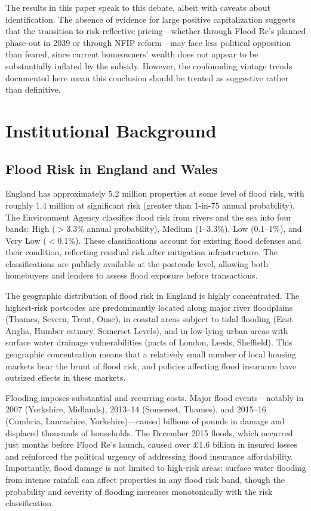 \documentclass[12pt]{article}
\begin{document}
The results in this paper speak to this debate, albeit with caveats about identification. The absence of evidence for large positive capitalization suggests that the transition to risk-reflective pricing---whether through Flood Re's planned phase-out in 2039 or through NFIP reform---may face less political opposition than feared, since current homeowners' wealth does not appear to be substantially inflated by the subsidy. However, the confounding vintage trends documented here mean this conclusion should be treated as suggestive rather than definitive.


\section{Institutional Background}
\label{sec:background}

\subsection{Flood Risk in England and Wales}

England has approximately 5.2 million properties at some level of flood risk, with roughly 1.4 million at significant risk (greater than 1-in-75 annual probability). The Environment Agency classifies flood risk from rivers and the sea into four bands: High ($>$3.3\% annual probability), Medium (1--3.3\%), Low (0.1--1\%), and Very Low ($<$0.1\%). These classifications account for existing flood defenses and their condition, reflecting residual risk after mitigation infrastructure. The classifications are publicly available at the postcode level, allowing both homebuyers and lenders to assess flood exposure before transactions.

The geographic distribution of flood risk in England is highly concentrated. The highest-risk postcodes are predominantly located along major river floodplains (Thames, Severn, Trent, Ouse), in coastal areas subject to tidal flooding (East Anglia, Humber estuary, Somerset Levels), and in low-lying urban areas with surface water drainage vulnerabilities (parts of London, Leeds, Sheffield). This geographic concentration means that a relatively small number of local housing markets bear the brunt of flood risk, and policies affecting flood insurance have outsized effects in these markets.

Flooding imposes substantial and recurring costs. Major flood events---notably in 2007 (Yorkshire, Midlands), 2013--14 (Somerset, Thames), and 2015--16 (Cumbria, Lancashire, Yorkshire)---caused billions of pounds in damage and displaced thousands of households. The December 2015 floods, which occurred just months before Flood Re's launch, caused over \pounds1.6 billion in insured losses and reinforced the political urgency of addressing flood insurance affordability. Importantly, flood damage is not limited to high-risk areas: surface water flooding from intense rainfall can affect properties in any flood risk band, though the probability and severity of flooding increases monotonically with the risk classification.
\end{document}
